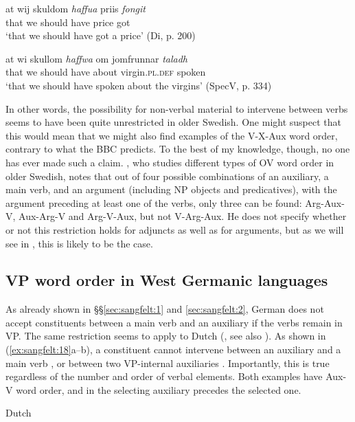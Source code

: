 \documentclass[output=paper, colorlinks, citecolor=brown]{langscibook}
\begin{document}
\ex\label{ex:sangfelt:17c}
\gll at wij skuldom \textit{haffua} {priis} \textit{fongit} \\
 that we should have price got\\
\glt ‘that we should have got a price' (Di, p. 200)

\ex\label{ex:sangfelt:17d}
\gll at wi skullom \textit{haffwa} {om} {jomfrunnar} \textit{taladh} \\
 that we should have about virgin.\textsc{pl.def} spoken\\
\glt ‘that we should have spoken about the virgins’ (SpecV, p. 334)
\z 
\z 

In other words, the possibility for non-verbal material to intervene between verbs seems to have been quite unrestricted in older Swedish. One might suspect that this would mean that we might also find examples of the V-X-Aux word order, contrary to what the BBC predicts. To the best of my knowledge, though, no one has ever made such a claim. \citet[155, 158–160]{Petzell2011}, who studies different types of OV word order in older Swedish, notes that out of four possible combinations of an auxiliary, a main verb, and an argument (including NP objects and predicatives), with the argument preceding at least one of the verbs, only three can be found: Arg-Aux-V, Aux-Arg-V and Arg-V-Aux, but not V-Arg-Aux. He does not specify whether or not this restriction holds for adjuncts as well as for arguments, but as we will see in , this is likely to be the case.

\subsection{VP word order in West Germanic languages}\label{sec:sangfelt:3.3}

As already shown in §§\ref{sec:sangfelt:1} and \ref{sec:sangfelt:2}, German does not accept constituents between a main verb and an auxiliary if the verbs remain in VP. The same restriction seems to apply to Dutch (\citealt[290--291]{Haider2010}, see also \citealt{Wurmbrand2004}). As shown in (\ref{ex:sangfelt:18}a–b), a constituent cannot intervene between an auxiliary and a main verb , or between two VP-internal auxiliaries . Importantly, this is true regardless of the number and order of verbal elements. Both examples have Aux-V word order, and in  the selecting auxiliary precedes the selected one.

\ea Dutch\label{ex:sangfelt:18}
\end{document}

